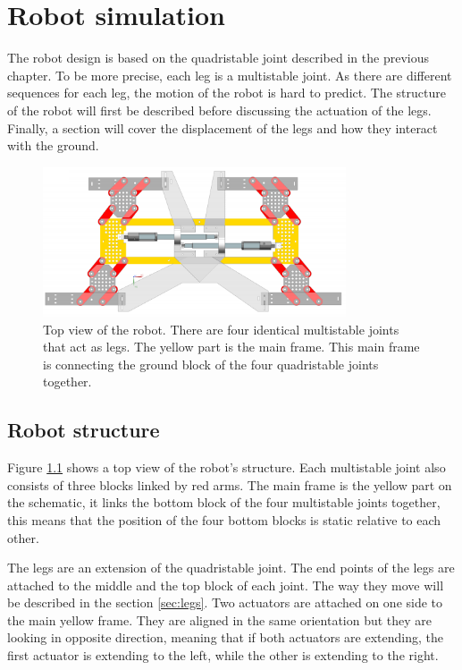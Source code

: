 \chapter{Robot simulation}
    The robot design is based on the quadristable joint described in the previous chapter. To be more precise, each leg is a multistable joint. As there are different sequences for each leg, the motion of the robot is hard to predict. The structure of the robot will first be described before discussing the actuation of the legs. Finally, a section will cover the displacement of the legs and how they interact with the ground.
    
    \begin{figure}[h!]
        \centering
        \includegraphics[width=0.8\textwidth]{images/top_view_robot.png}
        \caption{Top view of the robot. There are four identical multistable joints that act as legs. The yellow part is the main frame. This main frame is connecting the ground block of the four quadristable joints together. }
        \label{fig:robot_top_view}
    \end{figure}
    
    \section{Robot structure}
        Figure \ref{fig:robot_top_view} shows a top view of the robot's structure. Each multistable joint also consists of three blocks linked by red arms. The main frame is the yellow part on the schematic, it links the bottom block of the four multistable joints together, this means that the position of the four bottom blocks is static relative to each other. 
        
        
        The legs are an extension of the quadristable joint. The end points of the legs are attached to the middle and the top block of each joint. The way they move will be described in the section \ref{sec:legs}. Two actuators are attached on one side to the main yellow frame. They are aligned in the same orientation but they are looking in opposite direction, meaning that if both actuators are extending, the first actuator is extending to the left, while the other is extending to the right.
        
